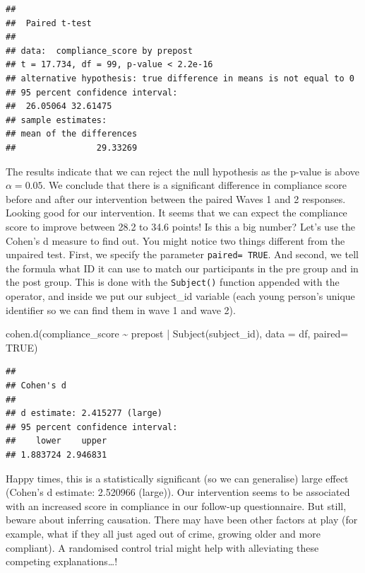 \documentclass[
]{book}
\newenvironment{Shaded}{\begin{snugshade}}{\end{snugshade}}
\newcommand{\AttributeTok}[1]{\textcolor[rgb]{0.77,0.63,0.00}{#1}}
\newcommand{\ConstantTok}[1]{\textcolor[rgb]{0.00,0.00,0.00}{#1}}
\newcommand{\FunctionTok}[1]{\textcolor[rgb]{0.00,0.00,0.00}{#1}}
\newcommand{\NormalTok}[1]{#1}
\newcommand{\SpecialCharTok}[1]{\textcolor[rgb]{0.00,0.00,0.00}{#1}}
\begin{document}
\begin{verbatim}
## 
##  Paired t-test
## 
## data:  compliance_score by prepost
## t = 17.734, df = 99, p-value < 2.2e-16
## alternative hypothesis: true difference in means is not equal to 0
## 95 percent confidence interval:
##  26.05064 32.61475
## sample estimates:
## mean of the differences 
##                29.33269
\end{verbatim}

The results indicate that we can reject the null hypothesis as the p-value is above \(\alpha = 0.05\). We conclude that there is a significant difference in compliance score before and after our intervention between the paired Waves 1 and 2 responses. Looking good for our intervention. It seems that we can expect the compliance score to improve between 28.2 to 34.6 points! Is this a big number? Let's use the Cohen's d measure to find out. You might notice two things different from the unpaired test. First, we specify the parameter \texttt{paired=\ TRUE}. And second, we tell the formula what ID it can use to match our participants in the pre group and in the post group. This is done with the \texttt{Subject()} function appended with the \texttt{\textbar{}} operator, and inside we put our subject\_id variable (each young person's unique identifier so we can find them in wave 1 and wave 2).

\begin{Shaded}
\begin{Highlighting}[]
\FunctionTok{cohen.d}\NormalTok{(compliance\_score }\SpecialCharTok{\textasciitilde{}}\NormalTok{ prepost }\SpecialCharTok{|} \FunctionTok{Subject}\NormalTok{(subject\_id), }\AttributeTok{data =}\NormalTok{ df, }\AttributeTok{paired=} \ConstantTok{TRUE}\NormalTok{)}
\end{Highlighting}
\end{Shaded}

\begin{verbatim}
## 
## Cohen's d
## 
## d estimate: 2.415277 (large)
## 95 percent confidence interval:
##    lower    upper 
## 1.883724 2.946831
\end{verbatim}

Happy times, this is a statistically significant (so we can generalise) large effect (Cohen's d estimate: 2.520966 (large)). Our intervention seems to be associated with an increased score in compliance in our follow-up questionnaire. But still, beware about inferring causation. There may have been other factors at play (for example, what if they all just aged out of crime, growing older and more compliant). A randomised control trial might help with alleviating these competing explanations\ldots!
\end{document}
